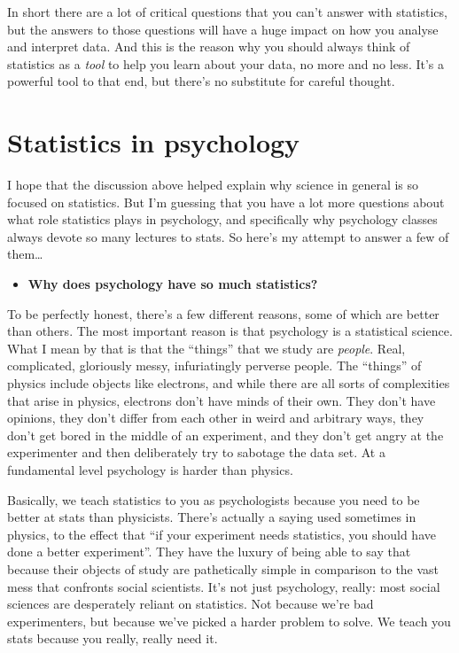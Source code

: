 \documentclass[
]{book}
\providecommand{\tightlist}{%
  \setlength{\itemsep}{0pt}\setlength{\parskip}{0pt}}
\begin{document}
In short there are a lot of critical questions that you can't answer with statistics, but the answers to those questions will have a huge impact on how you analyse and interpret data. And this is the reason why you should always think of statistics as a \emph{tool} to help you learn about your data, no more and no less. It's a powerful tool to that end, but there's no substitute for careful thought.

\section{Statistics in psychology}\label{statistics-in-psychology}

I hope that the discussion above helped explain why science in general is so focused on statistics. But I'm guessing that you have a lot more questions about what role statistics plays in psychology, and specifically why psychology classes always devote so many lectures to stats. So here's my attempt to answer a few of them\ldots{}

\begin{itemize}
\tightlist
\item
  \textbf{Why does psychology have so much statistics?}
\end{itemize}

To be perfectly honest, there's a few different reasons, some of which are better than others. The most important reason is that psychology is a statistical science. What I mean by that is that the ``things'' that we study are \emph{people}. Real, complicated, gloriously messy, infuriatingly perverse people. The ``things'' of physics include objects like electrons, and while there are all sorts of complexities that arise in physics, electrons don't have minds of their own. They don't have opinions, they don't differ from each other in weird and arbitrary ways, they don't get bored in the middle of an experiment, and they don't get angry at the experimenter and then deliberately try to sabotage the data set. At a fundamental level psychology is harder than physics.

Basically, we teach statistics to you as psychologists because you need to be better at stats than physicists. There's actually a saying used sometimes in physics, to the effect that ``if your experiment needs statistics, you should have done a better experiment''. They have the luxury of being able to say that because their objects of study are pathetically simple in comparison to the vast mess that confronts social scientists. It's not just psychology, really: most social sciences are desperately reliant on statistics. Not because we're bad experimenters, but because we've picked a harder problem to solve. We teach you stats because you really, really need it.
\end{document}
